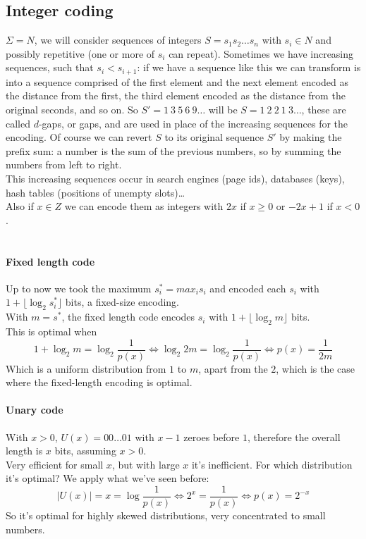 \documentclass[10pt]{report}
\begin{document}
\subsection{Integer coding}
$\Sigma = N$, we will consider sequences of integers $S = s_1s_2\ldots s_n$ with $s_i\in N$ and possibly repetitive (one or more of $s_i$ can repeat). Sometimes we have increasing sequences, such that $s_i < s_{i+1}$: if we have a sequence like this we can transform is into a sequence comprised of the first element and the next element encoded as the distance from the first, the third element encoded as the distance from the original seconds, and so on. So $S' = 1\:3\:5\:6\:9\ldots$ will be $S = 1\:2\:2\:1\:3\ldots$, these are called $d$-gaps, or gaps, and are used in place of the increasing sequences for the encoding. Of course we can revert $S$ to its original sequence $S'$ by making the prefix sum: a number is the sum of the previous numbers, so by summing the numbers from left to right.\\
This increasing sequences occur in search engines (page ids), databases (keys), hash tables (positions of unempty slots)\ldots\\
Also if $x\in Z$ we can encode them as integers with $2x$ if $x \geq 0$ or $-2x + 1$ if $x < 0$.\\\\
\paragraph{Fixed length code} Up to now we took the maximum $s_i^* = max_i s_i$ and encoded each $s_i$ with $1+ \lfloor \log_2 s_i^*\rfloor$ bits, a fixed-size encoding.\\
With $m = s^*$, the fixed length code encodes $s_i$ with $1+ \lfloor \log_2 m\rfloor$ bits.\\
This is optimal when $$1+ \log_2 m = \log_2 \frac{1}{p(x)}\Leftrightarrow \log_2 2m = \log_2 \frac{1}{p(x)} \Leftrightarrow p(x) = \frac{1}{2m}$$
Which is a uniform distribution from $1$ to $m$, apart from the $2$, which is the case where the fixed-length encoding is optimal.
\paragraph{Unary code} With $x>0$, $U(x)=00\ldots01$ with $x-1$ zeroes before $1$, therefore the overall length is $x$ bits, assuming $x > 0$.\\
Very efficient for small $x$, but with large $x$ it's inefficient. For which distribution it's optimal? We apply what we've seen before: $$|U(x)| = x = \log \frac{1}{p(x)} \Leftrightarrow  2^x = \frac{1}{p(x)} \Leftrightarrow p(x) = 2^{-x}$$ So it's optimal for highly skewed distributions, very concentrated to small numbers.
\end{document}
